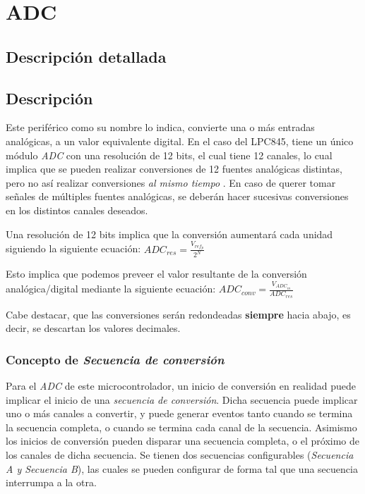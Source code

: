 \hypertarget{group__ADC}{}\section{A\+DC}
\label{group__ADC}


\subsection{Descripción detallada}
\subsection*{Descripción}

Este periférico como su nombre lo indica, convierte una o más entradas analógicas, a un valor equivalente digital. En el caso del L\+P\+C845, tiene un único módulo {\itshape A\+DC} con una resolución de 12 bits, el cual tiene 12 canales, lo cual implica que se pueden realizar conversiones de 12 fuentes analógicas distintas, pero no así realizar conversiones {\itshape  al mismo tiempo }. En caso de querer tomar señales de múltiples fuentes analógicas, se deberán hacer sucesivas conversiones en los distintos canales deseados.

Una resolución de 12 bits implica que la conversión aumentará cada unidad siguiendo la siguiente ecuación\+: $ ADC_{res} = \frac{V_{ref_{p}}}{2^N} $

Esto implica que podemos preveer el valor resultante de la conversión analógica/digital mediante la siguiente ecuación\+: $ ADC_{conv} = \frac{V_{ADC_{in}}}{ADC_{res}} $

Cabe destacar, que las conversiones serán redondeadas {\bfseries siempre} hacia abajo, es decir, se descartan los valores decimales.

\subsubsection*{Concepto de {\itshape Secuencia de conversión}}

Para el {\itshape A\+DC} de este microcontrolador, un inicio de conversión en realidad puede implicar el inicio de una {\itshape secuencia de conversión}. Dicha secuencia puede implicar uno o más canales a convertir, y puede generar eventos tanto cuando se termina la secuencia completa, o cuando se termina cada canal de la secuencia. Asimismo los inicios de conversión pueden disparar una secuencia completa, o el próximo de los canales de dicha secuencia. Se tienen dos secuencias configurables ({\itshape Secuencia A y Secuencia B}), las cuales se pueden configurar de forma tal que una secuencia interrumpa a la otra.

